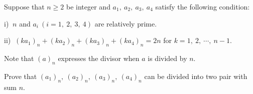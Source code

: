 Suppose that $ n\geq 2$ be integer and $ a_1,\ a_2,\ a_3,\ a_4$ satisfy the following condition:

i) $ \ n$ and $ a_i\ (i = 1,\ 2,\ 3,\ 4)$ are relatively prime.

ii) $ \ (ka_1)_n + (ka_2)_n + (ka_3)_n + (ka_4)_n = 2n$ for $ k = 1,\ 2,\ \cdots ,\ n - 1$.

Note that $ (a)_n$ expresses the divisor when $ a$ is divided by $ n$.

Prove that $ (a_1)_n,\ (a_2)_n,\ (a_3)_n,\ (a_4)_n$ can be divided into two pair with sum $ n$.